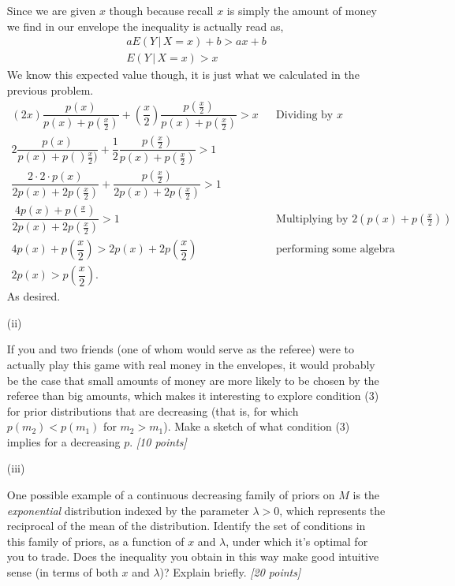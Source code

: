 \documentclass[12pt]{article}
\newcommand{\given}{\, | \,}
\begin{document}
\begin{itemize}
Since we are given $x$ though because recall $x$ is simply the amount of money we find in our envelope the inequality is actually read as,
\begin{align*}
    aE(Y\given X = x) + b > a x + b \\
    E(Y\given X = x) > x
\end{align*}
We know this expected value though, it is just what we calculated in the previous problem.
\begin{align*}
    (2x)\dfrac{p(x)}{p(x) + p(\frac{x}{2})} + (\dfrac{x}{2})\dfrac{ p \! \left( \frac{ x }{ 2 } \right) }{ p( x ) + p \! \left( \frac{ x }{ 2 } \right) } > x && \text{Dividing by $x$} \\
    2\dfrac{p(x)}{p(x)+ p()\frac{x}{2})} + \dfrac{1}{2}\dfrac{p(\frac{x}{2})}{p(x)+p(\frac{x}{2})} > 1 \\
    \dfrac{2\cdot2\cdot p(x)}{2p(x) + 2p(\frac{x}{2}) } + \dfrac{p(\frac{x}{2})}{2p(x)+2p(\frac{x}{2})} > 1 \\
    \dfrac{4p(x) + p(\frac{x}{})}{2p(x)+ 2p(\frac{x}{2})} > 1 && \text{Multiplying by $2(p(x)+p(\frac{x}{2}))$} \\
    4p(x) + p(\dfrac{x}{2}) > 2p(x) + 2p(\dfrac{x}{2}) && \text{performing some algebra} \\
    2p(x) > p(\dfrac{x}{2}).
\end{align*}As desired. 

\item[(ii)]%

If you and two friends (one of whom would serve as the referee) were to
actually play this game with real money in the envelopes, it would
probably be the case that small amounts of money are more likely to be
chosen by the referee than big amounts, which makes it interesting to
explore condition (3) for prior distributions that are decreasing (that
is, for which $p ( m_2 ) < p ( m_1 )$ for $m_2 > m_1$). Make a sketch of
what condition (3) implies for a decreasing $p$. \textit{[10 points]}
\newpage

\item[(iii)]%

One possible example of a
continuous decreasing family of priors on $M$ is the \textit{exponential}
distribution indexed by the parameter $\lambda > 0$,
which represents the reciprocal of the mean of the distribution. Identify the set of
conditions in this family of priors, as a function of $x$ and $\lambda$,
under which it's optimal for you to trade. Does the inequality you obtain
in this way make good intuitive sense (in terms of both $x$ and
$\lambda$)? Explain briefly. \textit{[20 points]}


\end{itemize}
\end{document}
